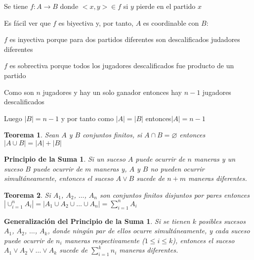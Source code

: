 \documentclass[a4paper,12pt]{report}
\newtheorem*{psm}{Principio de la Suma}
\newtheorem*{gpsm}{Generalización del Principio de la Suma}
\newtheorem*{pie}{Principio de Inclusión - Exclusión}
\newtheorem*{teo}{Teorema}
\begin{document}
 Se tiene  $f:A\rightarrow B$ donde $<x,y>\in f$ si $y$ pierde en el partido $x$
 
 Es fácil ver que $f$ es biyectiva y, por tanto, $A$ es coordinable con $B$:
 
 $f$ es inyectiva porque para dos partidos diferentes son descalificados judadores diferentes
 
 $f$ es sobrectiva porque todos los jugadores descalificados fue producto de un partido
 
 Como son $n$ jugadores y hay un solo ganador entonces hay $n-1$ jugadores descalificados
 
 Luego $|B|=n-1$ y por tanto como $|A|=|B|$ entonces$|A|=n-1$

 
 \begin{teo}
  Sean $A$ y $B$ conjuntos finitos, si $A\cap B = \varnothing$ entonces \\$|A\cup B|=|A|+|B|$
 \end{teo}
% 
% 
% 
% 
 

\begin{psm}
 Si un suceso $A$ puede ocurrir de $n$ maneras y un suceso $B$ puede ocurrir de $m$ maneras y, $A$ y $B$ no pueden ocurrir simultáneamente, entonces el suceso $A \lor  B$ sucede de $n + m$ maneras diferentes.
\end{psm}

\begin{teo}
 Si $A_1$, $A_2$, $\dots$, $A_n$ son conjuntos finitos disjuntos por pares entonces
 $|\cup^n_{i=1}A_i|=|A_1\cup A_2\cup \dots \cup A_n|=\sum^n_{i=1}A_i$
\end{teo}

\begin{gpsm}
 Si se tienen $k$ posibles sucesos $A_1$, $A_2$, $\dots$, $A_k$, donde ning\'un par de ellos ocurre simultáneamente, y cada suceso puede ocurrir de $n_i$ maneras respectivamente ($1\leq i \leq k$), entonces el suceso $A_1\vee A_2\vee \dots \vee A_k$ sucede de $\sum^k_{i=1}n_i$ maneras diferentes.
\end{gpsm}
\end{document}
